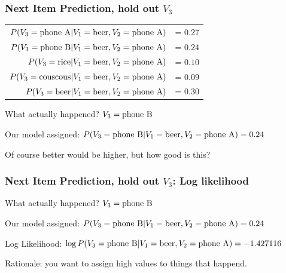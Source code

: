 \begin{frame}
  \frametitle{Next Item Prediction, hold out $V_3$}

  \begin{tabular}{r r}
    $P(V_3 = {\rm phone ~ A} | V_1 = {\rm beer}, V_2 = {\rm phone ~ A} )$ &= $0.27$ \\
    $P(V_3 = {\rm phone ~ B} | V_1 = {\rm beer}, V_2 = {\rm phone ~ A} )$ &= $0.24$ \\
    $P(V_3 = {\rm rice} | V_1 = {\rm beer}, V_2 = {\rm phone ~ A} )$ &= $0.10$ \\
    $P(V_3 = {\rm couscous} | V_1 = {\rm beer}, V_2 = {\rm phone ~ A} )$ &= $0.09$ \\
    $P(V_3 = {\rm beer} | V_1 = {\rm beer}, V_2 = {\rm phone ~ A} )$ &= $0.30$ \\
  \end{tabular}


\vspace{4mm}  
  \pause
What actually happened? \pause $V_3 = {\rm phone ~ B} $

\vspace{4mm}  
  \pause
Our model assigned: $P(V_3 = {\rm phone ~ B} | V_1 = {\rm beer}, V_2 = {\rm phone ~ A}) = 0.24$ 

\pause
Of course better would be higher, but how good is this?

 \end{frame}



 \begin{frame}
  \frametitle{Next Item Prediction, hold out $V_3$: Log likelihood}

What actually happened? \pause $V_3 = {\rm phone ~ B} $

\vspace{4mm}  
  \pause
Our model assigned: $P(V_3 = {\rm phone ~ B} | V_1 = {\rm beer}, V_2 = {\rm phone ~ A}) = 0.24$ 

\vspace{4mm}  

\pause
Log Likelihood:
$\log P(V_3 = {\rm phone ~ B} | V_1 = {\rm beer}, V_2 = {\rm phone ~ A}) = -1.427116$ 

\vspace{4mm}  

\pause
Rationale:  you want to assign high values to things that happend.

 \end{frame}




